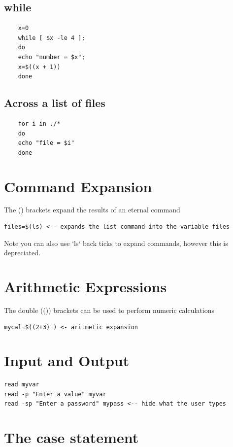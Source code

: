 \documentclass[22pt] {article}
\begin{document}
\subsection{while}
	
\begin{lstlisting}
	x=0
	while [ $x -le 4 ];
	do
	echo "number = $x";
	x=$((x + 1))
	done
\end{lstlisting}

\subsection{Across a list of files}

\begin{lstlisting}
	for i in ./*
	do
	echo "file = $i" 
	done
\end{lstlisting}

\pagebreak
\section{Command Expansion}

The () brackets  expand the results of an eternal command

\begin{lstlisting}
files=$(ls) <-- expands the list command into the variable files
\end{lstlisting}

Note you can also use `ls` back ticks to expand commands, however this is depreciated.  

\pagebreak
\section{Arithmetic  Expressions}
The double (()) brackets can be used to perform numeric calculations
\begin{lstlisting}
mycal=$((2+3) ) <- aritmetic expansion 	
\end{lstlisting}
\pagebreak
\section{Input and Output}
\begin{lstlisting}
read myvar
read -p "Enter a value" myvar
read -sp "Enter a password" mypass <-- hide what the user types
\end{lstlisting}
\pagebreak	
\section{ The case statement}
\end{document}
